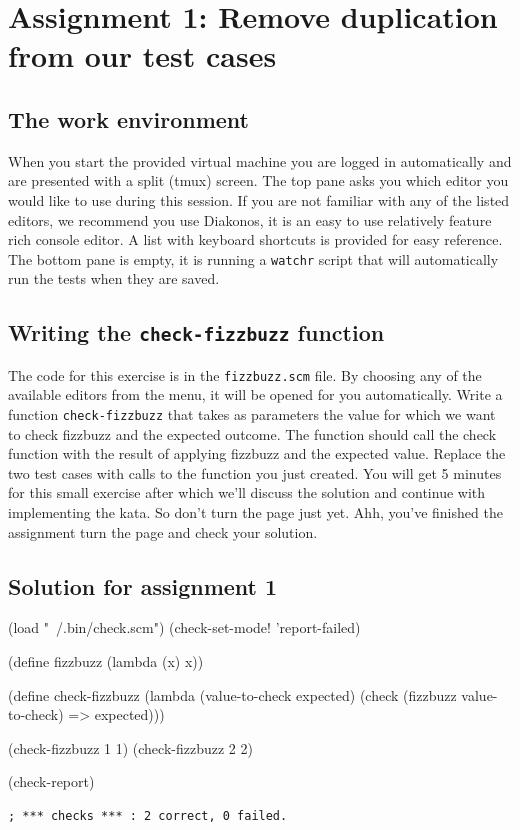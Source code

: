 \documentclass[12pt,a4paper,english,twoside]{article}
\begin{document}
\section{Assignment 1: Remove duplication from our test cases}
\subsection{The work environment}
When you start the provided virtual machine you are logged in automatically 
and are presented with a split (tmux) screen. The top pane asks you which 
editor you would like to use during this session. If you are not familiar with 
any of the listed editors, we recommend you use Diakonos, it is an easy to use 
relatively feature rich console editor. A list with keyboard shortcuts is 
provided for easy reference. The bottom pane is empty, it is running a 
\texttt{watchr} script that will automatically run the tests when they are 
saved.  
\subsection{Writing the \texttt{check-fizzbuzz} function}
The code for this exercise is in the \texttt{fizzbuzz.scm} file. By choosing 
any of the available editors from the menu, it will be opened for you 
automatically. Write a function \texttt{check-fizzbuzz} that takes as 
parameters the value for which we want to check fizzbuzz and the expected 
outcome. The function should call the check function with the result of 
applying fizzbuzz and the expected value. Replace the two test cases with 
calls to the function you just created. You will get 5 minutes for this small 
exercise after which we'll discuss the solution and continue with implementing 
the kata. So don't turn the page just yet. Ahh, you've finished the assignment 
turn the page and check your solution.
\vfill
\pagebreak
\subsection{Solution for assignment 1}
\begin{schemecode}
(load "~/.bin/check.scm")
(check-set-mode! 'report-failed)

(define fizzbuzz (lambda (x) x))

(define check-fizzbuzz 
  (lambda (value-to-check expected)
    (check (fizzbuzz value-to-check) => expected)))

(check-fizzbuzz 1 1)
(check-fizzbuzz 2 2)

(check-report)
\end{schemecode}
\begin{lstlisting}
; *** checks *** : 2 correct, 0 failed.  
\end{lstlisting}
\end{document}
